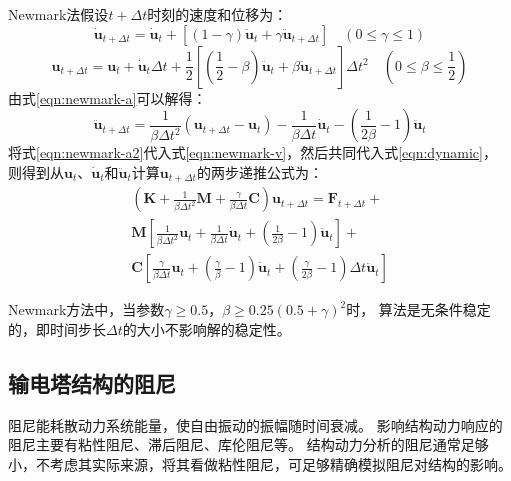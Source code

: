 Newmark法假设$t+\Delta t$时刻的速度和位移为：
\begin{equation}\label{eqn:newmark-v}
  \dot{\bm{u}}_{t+\Delta t}=\dot{\bm{u}}_{t}+\left[(1-\gamma)\ddot{\bm{u}}_t+\gamma \ddot{\bm{u}}_{t+\Delta t}\right] \quad(0 \leq \gamma \leq 1)
\end{equation}
\begin{equation}\label{eqn:newmark-a}
  \bm{u}_{t+\Delta t}=\bm{u}_t + \dot{\bm{u}}_{t} \Delta t+\frac{1}{2}\left[\left(\frac{1}{2}-\beta\right)\ddot{\bm{u}}_{t}+\beta\ddot{\bm{u}}_{t+\Delta t}\right] \Delta t^2 \quad \left(0 \leq \beta \leq \frac{1}{2}\right)
\end{equation}
由式\eqref{eqn:newmark-a}可以解得：
\begin{equation}\label{eqn:newmark-a2}
  \ddot{\bm{u}}_{t+\Delta t}=\frac{1}{\beta \Delta t^2} \left(\bm{u}_{t+\Delta t}-\bm{u}_{t}\right)-\frac{1}{\beta \Delta t} \dot{\bm{u}}_t - \left(\frac{1}{2\beta}-1\right) \ddot{\bm{u}}_t
\end{equation}
将式\eqref{eqn:newmark-a2}代入式\eqref{eqn:newmark-v}，然后共同代入式\eqref{eqn:dynamic}，
则得到从$\bm{u}_t$、$\dot{\bm{u}}_t$和$\ddot{\bm{u}}_t$计算$\bm{u}_{t+\Delta t}$的两步递推公式为：
\begin{equation}
\begin{split}
  \left(\bm{K}+\frac{1}{\beta \Delta t^2} \bm{M} + \frac{\gamma}{\beta \Delta t} \bm{C} \right) \bm{u}_{t+\Delta t} = \bm{F}_{t+\Delta t} + \\
  \bm{M} \left[ \frac{1}{\beta \Delta t^2} \bm{u}_t + \frac{1}{\beta \Delta t} \dot{\bm{u}}_t + \left(\frac{1}{2\beta} - 1 \right)\ddot{\bm{u}}_t\right] + \\
  \bm{C} \left[ \frac{\gamma}{\beta \Delta t} \bm{u}_t + \left(\frac{\gamma}{\beta} - 1 \right) \dot{\bm{u}}_t + \left(\frac{\gamma}{2\beta} - 1 \right) \Delta t \ddot{\bm{u}}_t\right]
\end{split}
\end{equation}

Newmark方法中，当参数$\gamma\geq 0.5$，$\beta \geq 0.25\left(0.5 + \gamma\right)^2$时，
算法是无条件稳定的，即时间步长$\Delta t$的大小不影响解的稳定性。


\subsection{输电塔结构的阻尼}

阻尼能耗散动力系统能量，使自由振动的振幅随时间衰减。
影响结构动力响应的阻尼主要有粘性阻尼、滞后阻尼、库伦阻尼等\cite{chopra2007dynamic}。
结构动力分析的阻尼通常足够小，不考虑其实际来源，将其看做粘性阻尼，可足够精确模拟阻尼对结构的影响。

